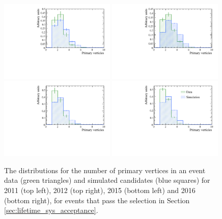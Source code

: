 {\begin{figure}[htbp]
  \centering
    \includegraphics[width=0.49\textwidth]{./Figs/LifetimeSystematics/2011_nPVs.pdf}
    \includegraphics[width=0.49\textwidth]{./Figs/LifetimeSystematics/2012_nPVs.pdf}
    \includegraphics[width=0.49\textwidth]{./Figs/LifetimeSystematics/2015_nPVs.pdf}
    \includegraphics[width=0.49\textwidth]{./Figs/LifetimeSystematics/2016_nPVs.pdf}
  \caption{The distributions for the number of primary vertices in an event \bdkpi data (green triangles) and simulated candidates (blue squares) for 2011 (top left), 2012 (top right), 2015 (bottom left) and 2016 (bottom right), for events that pass the selection in Section \ref{sec:lifetime_sys_acceptance}.}
  \label{fig:Bd2KPi_nPVs_MC_data_comparison}
\end{figure}


}
